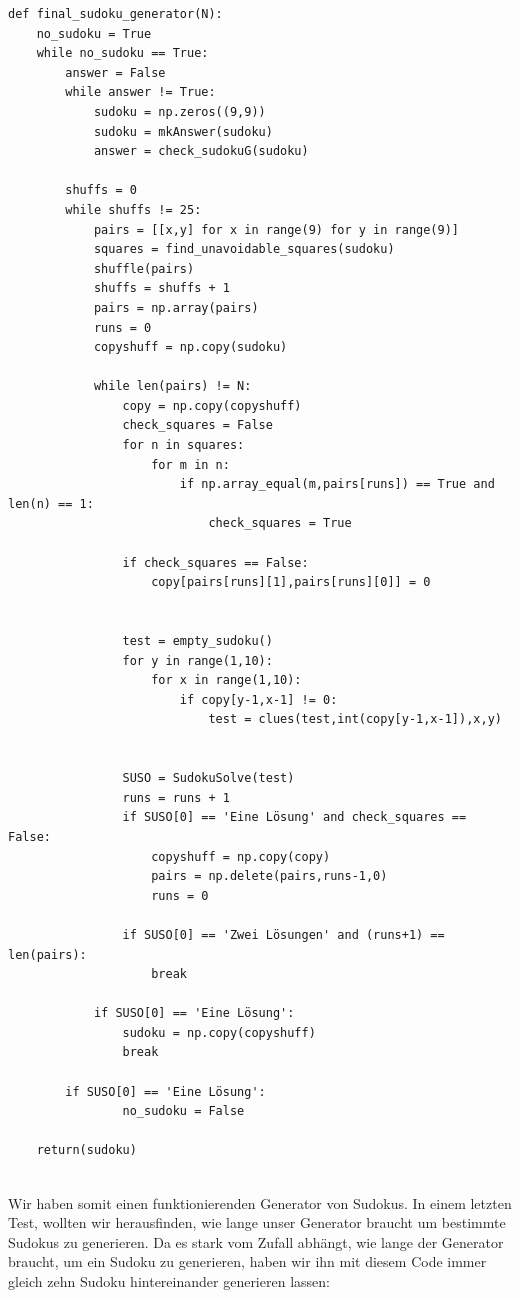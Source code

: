 \documentclass[11pt,a4paper]{article}
\begin{document}
\begin{verbatim}
def final_sudoku_generator(N):
    no_sudoku = True
    while no_sudoku == True:
        answer = False
        while answer != True:
            sudoku = np.zeros((9,9))
            sudoku = mkAnswer(sudoku)
            answer = check_sudokuG(sudoku)
        
        shuffs = 0
        while shuffs != 25:
            pairs = [[x,y] for x in range(9) for y in range(9)]
            squares = find_unavoidable_squares(sudoku)
            shuffle(pairs)
            shuffs = shuffs + 1
            pairs = np.array(pairs)
            runs = 0
            copyshuff = np.copy(sudoku)
            
            while len(pairs) != N:
                copy = np.copy(copyshuff)
                check_squares = False
                for n in squares:
                    for m in n:
                        if np.array_equal(m,pairs[runs]) == True and len(n) == 1:
                            check_squares = True
                        
                if check_squares == False:
                    copy[pairs[runs][1],pairs[runs][0]] = 0
                        
                        
                test = empty_sudoku()
                for y in range(1,10):
                    for x in range(1,10):
                        if copy[y-1,x-1] != 0:
                            test = clues(test,int(copy[y-1,x-1]),x,y)
                        
            
                SUSO = SudokuSolve(test)
                runs = runs + 1
                if SUSO[0] == 'Eine Lösung' and check_squares == False:
                    copyshuff = np.copy(copy)
                    pairs = np.delete(pairs,runs-1,0)
                    runs = 0
                    
                if SUSO[0] == 'Zwei Lösungen' and (runs+1) == len(pairs):
                    break
                
            if SUSO[0] == 'Eine Lösung':
                sudoku = np.copy(copyshuff)
                break
            
        if SUSO[0] == 'Eine Lösung':
                no_sudoku = False
    
    return(sudoku)
\end{verbatim}
\ \\
Wir haben somit einen funktionierenden Generator von Sudokus. In einem letzten Test, wollten wir herausfinden, wie lange unser Generator braucht um bestimmte Sudokus zu generieren. Da es stark vom Zufall abhängt, wie lange der Generator braucht, um ein Sudoku zu generieren, haben wir ihn mit diesem Code immer gleich zehn Sudoku hintereinander generieren lassen:
\end{document}
